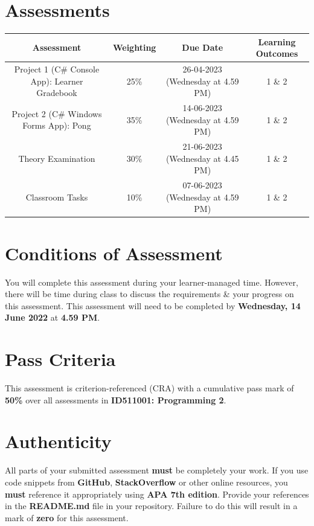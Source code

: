 \documentclass{article}
\begin{document}
\section*{Assessments}
\renewcommand{\arraystretch}{1.5}
\begin{tabular}{|c|c|c|c|}
	\hline
	\textbf{Assessment}                                 & \textbf{Weighting} & \textbf{Due Date}            & \textbf{Learning Outcomes} \\ \hline
	\small Project 1 (C\# Console App): Learner Gradebook  & \small 25\%        & \small 26-04-2023 (Wednesday at 4.59 PM)   & \small 1 \& 2                   \\ \hline
	\small Project 2 (C\# Windows Forms App): Pong & \small 35\%        & \small 14-06-2023 (Wednesday at 4.59 PM)   & \small 1 \& 2                   \\ \hline
	\small Theory Examination                        & \small 30\%        & \small 21-06-2023 (Wednesday at 4.45 PM)  & \small 1 \& 2                   \\ \hline
	\small Classroom Tasks                       & \small 10\%        & \small 07-06-2023 (Wednesday at 4.59 PM)  & \small 1 \& 2                   \\ \hline
\end{tabular} 

\section*{Conditions of Assessment}
You will complete this assessment during your learner-managed time. However, there will be time during class to discuss the requirements \& your progress on this assessment. This assessment will need to be completed by \textbf{Wednesday, 14 June 2022} at \textbf{4.59 PM}.

\section*{Pass Criteria}
This assessment is criterion-referenced (CRA) with a cumulative pass mark of \textbf{50\%} over all assessments in \textbf{ID511001: Programming 2}.

\section*{Authenticity}
All parts of your submitted assessment \textbf{must} be completely your work. If you use code snippets from \textbf{GitHub}, \textbf{StackOverflow} or other online resources, you \textbf{must} reference it appropriately using \textbf{APA 7th edition}. Provide your references in the \textbf{README.md} file in your repository. Failure to do this will result in a mark of \textbf{zero} for this assessment.
\end{document}
